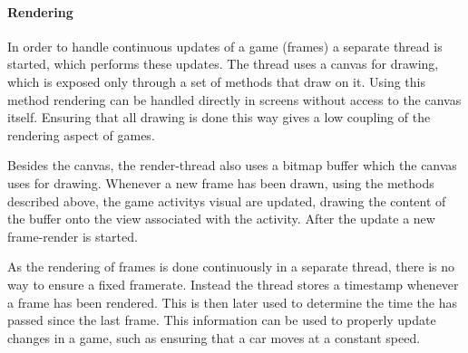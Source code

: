\paragraph{Rendering}
In order to handle continuous updates of a game (frames) a separate thread is started, which performs these updates.
The thread uses a canvas for drawing, which is exposed only through a set of methods that draw on it.
Using this method rendering can be handled directly in screens without access to the canvas itself.
Ensuring that all drawing is done this way gives a low coupling of the rendering aspect of games.

Besides the canvas, the render-thread also uses a bitmap buffer which the canvas uses for drawing.
Whenever a new frame has been drawn, using the methods described above, the game activitys visual are updated, drawing the content of the buffer onto the view associated with the activity.
After the update a new frame-render is started.

As the rendering of frames is done continuously in a separate thread, there is no way to ensure a fixed framerate.
Instead the thread stores a timestamp whenever a frame has been rendered.
This is then later used to determine the time the has passed since the last frame.
This information can be used to properly update changes in a game, such as ensuring that a car moves at a constant speed.
